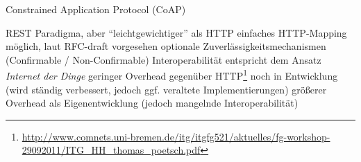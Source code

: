 \begin{frame}{Constrained Application Protocol (CoAP)}{}
        \begin{proconlist}
            \pro REST Paradigma, aber \enquote{leichtgewichtiger} als HTTP
            \pro einfaches HTTP-Mapping möglich, laut RFC-draft vorgesehen
            \pro optionale Zuverlässigkeitsmechanismen (Confirmable / Non-Confirmable)
            \pro Interoperabilität
            \pro entspricht dem Ansatz \emph{Internet der Dinge}
            \pro geringer Overhead gegenüber
HTTP\footnote{\url{http://www.comnets.uni-bremen.de/itg/itgfg521/aktuelles/fg-workshop-29092011/ITG_HH_thomas_poetsch.pdf}}
            \procon noch in Entwicklung (wird ständig verbessert, jedoch ggf. veraltete Implementierungen)
            \contra größerer Overhead als Eigenentwicklung\newline
			(jedoch mangelnde Interoperabilität)
        \end{proconlist}
\end{frame}


